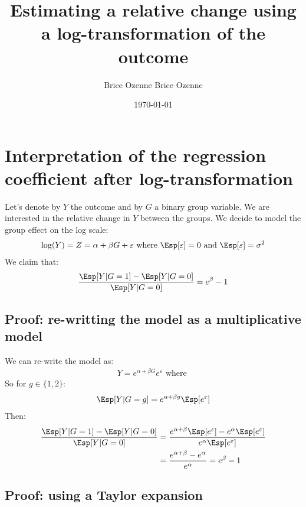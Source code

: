 \documentclass[12pt]{article}
\author{Brice Ozenne Brice Ozenne}
\date{\today}
\title{Estimating a relative change using a log-transformation of the outcome}
\begin{document}
\maketitle

\section{Interpretation of the regression coefficient after log-transformation}
\label{sec:orgc129c1f}
Let's denote by \(Y\) the outcome and by \(G\) a binary group
variable. We are interested in the relative change in \(Y\) between
the groups. We decide to model the group effect on the log scale:
\begin{align*}
\log(Y) = Z = \alpha + \beta G + \varepsilon \text{ where } \Esp[\varepsilon]=0 \text{ and } \Esp[\varepsilon]=\sigma^2
\end{align*}
We claim that:
\begin{align*}
\frac{\Esp[Y|G=1]-\Esp[Y|G=0]}{\Esp[Y|G=0]} = e^{\beta} - 1
\end{align*}

\subsection{Proof: re-writting the model as a multiplicative model}
\label{sec:org0b6e2a1}
We can re-write the model as:
\begin{align*}
Y = e^{\alpha + \beta G}e^{\varepsilon} \text{ where }
\end{align*}
So for \(g\in\{1,2\}\):
\begin{align*}
\Esp[Y|G=g] = e^{\alpha + \beta g} \Esp[e^{\varepsilon}]
\end{align*}
Then:
\begin{align*}
\frac{\Esp[Y|G=1]-\Esp[Y|G=0]}{\Esp[Y|G=0]}
& = \frac{e^{\alpha + \beta} \Esp[e^{\varepsilon}]-e^{\alpha} \Esp[e^{\varepsilon}]}{e^{\alpha} \Esp[e^{\varepsilon}]} \\
& = \frac{e^{\alpha + \beta} -e^{\alpha}}{e^{\alpha}}  = e^{\beta} - 1 \\
\end{align*}

\subsection{Proof: using a Taylor expansion}
\label{sec:org15fa186}
\end{document}
